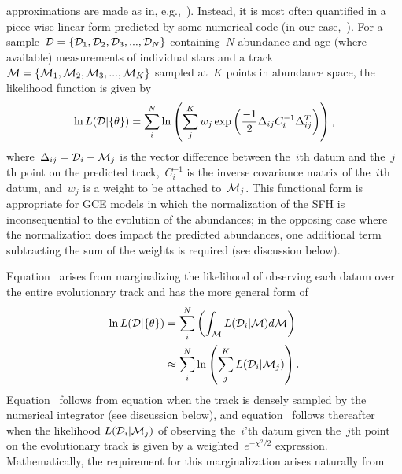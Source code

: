 \documentclass[ms.tex]{subfiles}
\begin{document}
approximations are made as in, e.g.,~\citealp{Weinberg2017}).
Instead, it is most often quantified in a piece-wise linear form predicted by
some numerical code (in our case,~\vice).
For a sample~$\mathcal{D} = \{\mathcal{D}_1, \mathcal{D}_2, \mathcal{D}_3, ...,
\mathcal{D}_N\}$ containing~$N$ abundance and age (where available) measurements
of individual stars and a track~$\mathcal{M} = \{\mathcal{M}_1, \mathcal{M}_2,
\mathcal{M}_3, ..., \mathcal{M}_K\}$ sampled at~$K$ points in abundance space,
the likelihood function is given by
\begin{equation}
\ln L(\mathcal{D} | \{\theta\}) = \sum_i^N \ln \left(
\sum_j^K w_j \exp\left(
\frac{-1}{2}\Delta_{ij}C_i^{-1}\Delta_{ij}^T
\right)
\right),
\label{eq:likelihood}
\end{equation}
where~$\Delta_{ij} = \mathcal{D}_i - \mathcal{M}_j$ is the vector difference
between the~$i$th datum and the~$j$th point on the predicted track,~$C_i^{-1}$
is the inverse covariance matrix of the~$i$th datum, and~$w_j$ is a weight to
be attached to~$\mathcal{M}_j$.
This functional form is appropriate for GCE models in which the normalization
of the SFH is inconsequential to the evolution of the abundances; in the
opposing case where the normalization does impact the predicted abundances,
one additional term subtracting the sum of the weights is required (see
discussion below).
\par
Equation~ arises from marginalizing the likelihood of
observing each datum over the entire evolutionary track and has the more
general form of
\begin{subequations}\begin{align}
\ln L(\mathcal{D} | \{\theta\}) &= \sum_i^N \left(
\int_{\mathcal{M}} L(\mathcal{D}_i | \mathcal{M}) d\mathcal{M}
\right)
\label{eq:likelihood_general_int}
\\
&\approx \sum_i^N \ln \left(
\sum_j^K L(\mathcal{D}_i | \mathcal{M}_j)\right). 
\label{eq:likelihood_general}
\end{align}\end{subequations}
Equation~ follows from equation
 when the track is densely sampled by the
numerical integrator (see discussion below), and equation~
follows thereafter when the likelihood $L(\mathcal{D}_i | \mathcal{M}_j)$ of
observing the~$i$'th datum given the~$j$th point on the evolutionary track is
given by a weighted~$e^{-\chi^2/2}$ expression.
Mathematically, the requirement for this marginalization arises naturally from
\end{document}
